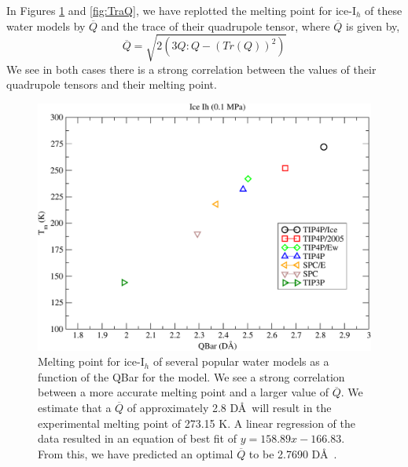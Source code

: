 In Figures \ref{fig:QBar} and \ref{fig:TraQ},
we have replotted the 
melting point for ice-I$_h$ of these water models by $\overline{Q}$ and the 
trace of their
quadrupole tensor, where $\overline{Q}$ is given by,
\begin{equation}
\overline{Q} = \sqrt{2(3 Q:Q - (Tr(Q))^{2})}
\end{equation}
We see in both cases there is a strong correlation between
the values of their quadrupole tensors and their melting point.


\begin{figure}
\includegraphics[width=\linewidth]{Figures/Tm_Ih_Qbar_plot.pdf}
\caption{\label{fig:QBar} Melting point for ice-I$_h$ of several
  popular water models as a function of the QBar for the model. We see
  a strong correlation between a more accurate melting point and a
  larger value of $\overline{Q}$. We estimate that a $\overline{Q}$ of
  approximately 2.8 D\AA~will result in the experimental melting point
  of 273.15 K. A linear regression of the data resulted in an equation
  of best fit of $y = 158.89x - 166.83$. From this, we have predicted
  an optimal $\overline{Q}$ to be 2.7690 D\AA~.}
\end{figure}

